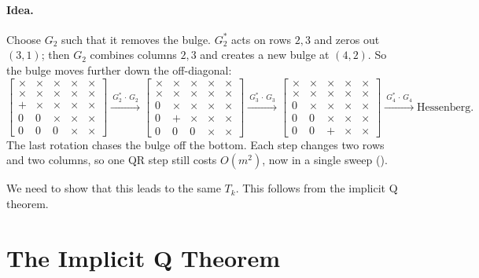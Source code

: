 \paragraph{Idea.} Choose $G_2$ such that it removes the bulge. $G_2^\ast$ acts on rows $2, 3$ and zeros out $(3,1)$; then $G_2$ combines columns $2, 3$ and creates a new bulge at $(4,2)$. So the bulge moves further down the off-diagonal:
\begingroup\setlength{\arraycolsep}{3.5pt}
\begin{equation}
  \begin{bmatrix} \times & \times & \times & \times & \times \\ \times & \times & \times & \times & \times \\ \bm{+} & \times & \times & \times & \times \\ 0 & 0 & \times & \times & \times \\ 0 & 0 & 0 & \times & \times \end{bmatrix}
  \xrightarrow{\ G_2^\ast\,\cdot\,G_2\ }
  \begin{bmatrix} \times & \times & \times & \times & \times \\ \times & \times & \times & \times & \times \\ 0 & \times & \times & \times & \times \\ 0 & \bm{+} & \times & \times & \times \\ 0 & 0 & 0 & \times & \times \end{bmatrix}
  \xrightarrow{\ G_3^\ast\,\cdot\,G_3\ }
  \begin{bmatrix} \times & \times & \times & \times & \times \\ \times & \times & \times & \times & \times \\ 0 & \times & \times & \times & \times \\ 0 & 0 & \times & \times & \times \\ 0 & 0 & \bm{+} & \times & \times \end{bmatrix}
  \xrightarrow{\ G_4^\ast\,\cdot\,G_4\ }
  \text{Hessenberg}.
\end{equation}
\endgroup
The last rotation chases the bulge off the bottom. Each step changes two rows and two columns, so one QR step still costs $O(m^2)$, now in a single sweep ().

We need to show that this leads to the same $T_k$. This follows from the implicit Q theorem.

\section{The Implicit Q Theorem}
\label{sec:implicit-q}

